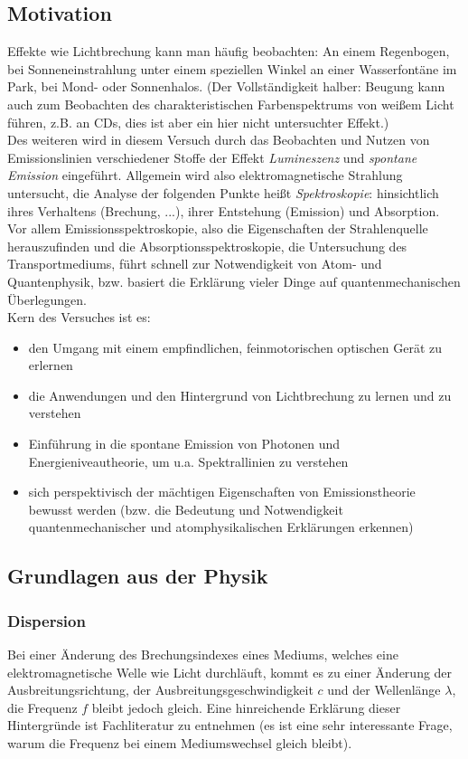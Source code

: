 \subsection{Motivation}
Effekte wie Lichtbrechung kann man häufig beobachten: An einem Regenbogen, bei Sonneneinstrahlung unter einem speziellen Winkel an einer Wasserfontäne im Park, bei Mond- oder Sonnenhalos. 
(Der Vollständigkeit halber: Beugung kann auch zum Beobachten des charakteristischen Farbenspektrums von weißem Licht führen, z.B. an CDs, dies ist aber ein hier nicht untersuchter Effekt.)\\
Des weiteren wird in diesem Versuch durch das Beobachten und Nutzen von Emissionslinien verschiedener Stoffe der Effekt \emph{Lumineszenz} und \emph{spontane Emission} eingeführt. 
Allgemein wird also elektromagnetische Strahlung untersucht, die Analyse der folgenden Punkte heißt \emph{Spektroskopie}: hinsichtlich ihres Verhaltens (Brechung, ...), ihrer Entstehung (Emission) und Absorption. 
Vor allem Emissionsspektroskopie, also die Eigenschaften der Strahlenquelle herauszufinden und die Absorptionsspektroskopie, die Untersuchung des Transportmediums, führt schnell zur Notwendigkeit von Atom- und Quantenphysik, bzw. basiert die Erklärung vieler Dinge auf quantenmechanischen Überlegungen.\\
Kern des Versuches ist es:
\begin{itemize}
    \item den Umgang mit einem empfindlichen, feinmotorischen optischen Gerät zu erlernen
    \item die Anwendungen und den Hintergrund von Lichtbrechung zu lernen und zu verstehen
    \item Einführung in die spontane Emission von Photonen und Energieniveautheorie, um u.a. Spektrallinien zu verstehen
    \item sich perspektivisch der mächtigen Eigenschaften von \glqq Emissionstheorie\grqq{} bewusst werden (bzw. die Bedeutung und Notwendigkeit quantenmechanischer und atomphysikalischen Erklärungen erkennen) 
\end{itemize}

\subsection[Theoretische Grundlagen aus der Physik]{Grundlagen aus der Physik \autocite{Skript_1}}
\subsubsection{Dispersion}
Bei einer Änderung des Brechungsindexes eines Mediums, welches eine elektromagnetische Welle wie Licht durchläuft, kommt es zu einer Änderung der Ausbreitungsrichtung, der Ausbreitungsgeschwindigkeit \(c\) und der Wellenlänge \(\lambda\), die Frequenz \(f\) bleibt jedoch gleich. Eine hinreichende Erklärung dieser Hintergründe ist Fachliteratur zu entnehmen (es ist eine sehr interessante Frage, warum die Frequenz bei einem Mediumswechsel gleich bleibt).

